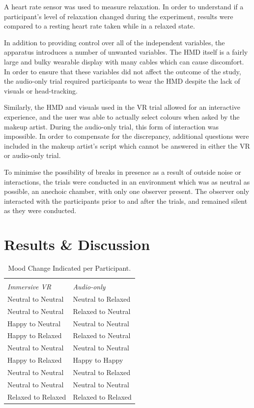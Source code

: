 \documentclass{sigchi}
\begin{document}
A heart rate sensor was used to measure relaxation. In order to understand if a participant's level of relaxation changed during the experiment, results were compared to a resting heart rate taken while in a relaxed state.

In addition to providing control over all of the independent variables, the apparatus introduces a number of unwanted variables. The HMD itself is a fairly large and bulky wearable display with many cables which can cause discomfort. In order to ensure that these variables did not affect the outcome of the study, the audio-only trial required participants to wear the HMD despite the lack of visuals or head-tracking.

Similarly, the HMD and visuals used in the VR trial allowed for an interactive experience, and the user was able to actually select colours when asked by the makeup artist. During the audio-only trial, this form of interaction was impossible. In order to compensate for the discrepancy, additional questions were included in the makeup artist's script which cannot be answered in either the VR or audio-only trial.

To minimise the possibility of breaks in presence as a result of outside noise or interactions, the trials were conducted in an environment which was as neutral as possible, an anechoic chamber, with only one observer present. The observer only interacted with the participants prior to and after the trials, and remained silent as they were conducted.




\section{Results \& Discussion}


\begin{table}[htb]
  \centering
  \begin{tabular}{l l}
    \toprule\\
    {\textit{Immersive VR}} & {\textit{Audio-only}}\\
    \midrule
    {Neutral to Neutral} & {Neutral to Relaxed} \\
    Neutral to Neutral & Relaxed to Neutral \\
    Happy to Neutral & Neutral to Neutral \\
    Happy to Relaxed & Relaxed to Neutral \\
    Neutral to Neutral & Neutral to Neutral \\
    Happy to Relaxed & Happy to Happy \\
    Neutral to Neutral & Neutral to Relaxed \\
    Neutral to Neutral & Neutral to Neutral \\
    Relaxed to Relaxed & Relaxed to Relaxed \\
     \bottomrule
  \end{tabular}
  \caption{Mood Change Indicated per Participant.}~\label{tab:mood_change}
\end{table}
\end{document}
